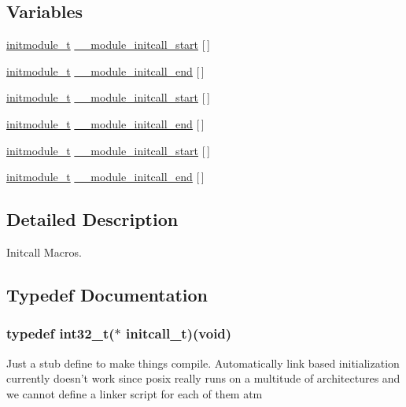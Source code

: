 \subsection*{Variables}
\begin{DoxyCompactItemize}
\item 
\hyperlink{structinitmodule__t}{initmodule\-\_\-t} \hyperlink{group___p_i_o_s___i_n_i_t_c_a_l_l_gaa34043b309a5d9e66ea205addc66701d}{\-\_\-\-\_\-module\-\_\-initcall\-\_\-start} \mbox{[}$\,$\mbox{]}
\item 
\hyperlink{structinitmodule__t}{initmodule\-\_\-t} \hyperlink{group___p_i_o_s___i_n_i_t_c_a_l_l_ga6b38c970a2c1607f469526ed3c8b6aaa}{\-\_\-\-\_\-module\-\_\-initcall\-\_\-end} \mbox{[}$\,$\mbox{]}
\item 
\hyperlink{structinitmodule__t}{initmodule\-\_\-t} \hyperlink{group___p_i_o_s___i_n_i_t_c_a_l_l_gaa34043b309a5d9e66ea205addc66701d}{\-\_\-\-\_\-module\-\_\-initcall\-\_\-start} \mbox{[}$\,$\mbox{]}
\item 
\hyperlink{structinitmodule__t}{initmodule\-\_\-t} \hyperlink{group___p_i_o_s___i_n_i_t_c_a_l_l_ga6b38c970a2c1607f469526ed3c8b6aaa}{\-\_\-\-\_\-module\-\_\-initcall\-\_\-end} \mbox{[}$\,$\mbox{]}
\item 
\hyperlink{structinitmodule__t}{initmodule\-\_\-t} \hyperlink{group___p_i_o_s___i_n_i_t_c_a_l_l_gaa34043b309a5d9e66ea205addc66701d}{\-\_\-\-\_\-module\-\_\-initcall\-\_\-start} \mbox{[}$\,$\mbox{]}
\item 
\hyperlink{structinitmodule__t}{initmodule\-\_\-t} \hyperlink{group___p_i_o_s___i_n_i_t_c_a_l_l_ga6b38c970a2c1607f469526ed3c8b6aaa}{\-\_\-\-\_\-module\-\_\-initcall\-\_\-end} \mbox{[}$\,$\mbox{]}
\end{DoxyCompactItemize}


\subsection{Detailed Description}
Initcall Macros. 

\subsection{Typedef Documentation}
\hypertarget{group___p_i_o_s___i_n_i_t_c_a_l_l_ga4f58a033b271ad632c4583977de7e3c0}{
\subsubsection[{initcall\-\_\-t}]{\setlength{\rightskip}{0pt plus 5cm}typedef {\bf int32\-\_\-t}($\ast$ initcall\-\_\-t)({\bf void})}}\label{group___p_i_o_s___i_n_i_t_c_a_l_l_ga4f58a033b271ad632c4583977de7e3c0}
Just a stub define to make things compile. Automatically link based initialization currently doesn't work since posix really runs on a multitude of architectures and we cannot define a linker script for each of them atm 

